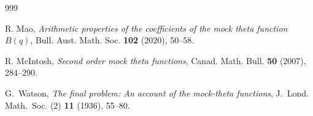 \documentclass[12pt,reqno]{amsart}
\renewcommand{\(}{\left\(}
\renewcommand{\)}{\right\)}
\numberwithin{equation}{section}
\theoremstyle{plain}
\theoremstyle{definition}
\numberwithin{equation}{section}
\begin{document}
\begin{thebibliography}{999}


 R. Mao, {\it Arithmetic properties of the coefficients of the mock theta function $B(q)$}, Bull. Aust. Math. Soc. {\bf 102} (2020), 50--58.


	
 R. McIntosh, {\it Second order mock theta functions}, Canad. Math. Bull. {\bf 50} (2007), 284--290.

    

 G.~Watson, {\it The final problem: An account of the mock-theta functions}, J.~Lond. Math.~Soc. (2) \textbf{11} (1936), 55--80.
   
    
    
  
\end{thebibliography}
\end{document}
